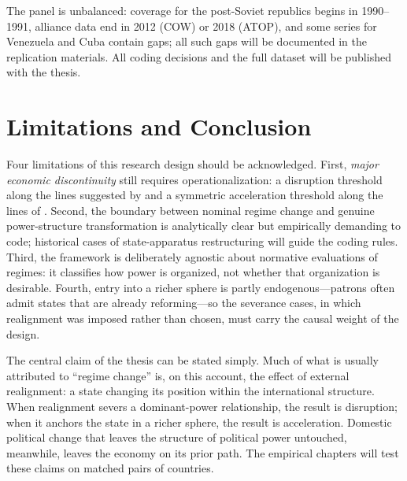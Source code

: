 \documentclass[11pt]{article}
\begin{document}
The panel is unbalanced: coverage for the post-Soviet republics begins in 1990--1991, alliance data end in 2012 (COW) or 2018 (ATOP), and some series for Venezuela and Cuba contain gaps; all such gaps will be documented in the replication materials. All coding decisions and the full dataset will be published with the thesis.

\section{Limitations and Conclusion}
\label{sec:discussion}

Four limitations of this research design should be acknowledged. First, \emph{major economic discontinuity} still requires operationalization: a disruption threshold along the lines suggested by \textcite{rodrik_1999} and a symmetric acceleration threshold along the lines of \textcite{hausmann_pritchett_rodrik_2005}. Second, the boundary between nominal regime change and genuine power-structure transformation is analytically clear \parencite{garciatrevijano2010,linz_stepan_1996} but empirically demanding to code; historical cases of state-apparatus restructuring \parencite{skocpol_1979} will guide the coding rules. Third, the framework is deliberately agnostic about normative evaluations of regimes: it classifies how power is organized, not whether that organization is desirable. Fourth, entry into a richer sphere is partly endogenous---patrons often admit states that are already reforming---so the severance cases, in which realignment was imposed rather than chosen, must carry the causal weight of the design.

The central claim of the thesis can be stated simply. Much of what is usually attributed to ``regime change'' is, on this account, the effect of external realignment: a state changing its position within the international structure. When realignment severs a dominant-power relationship, the result is disruption; when it anchors the state in a richer sphere, the result is acceleration. Domestic political change that leaves the structure of political power untouched, meanwhile, leaves the economy on its prior path. The empirical chapters will test these claims on matched pairs of countries.

\printbibliography
\end{document}
